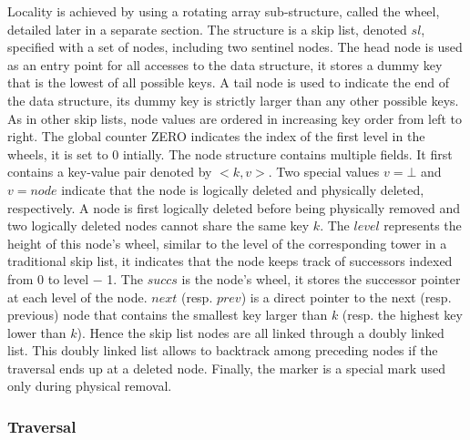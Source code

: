 \documentclass{article}
\begin{document}
Locality is achieved by using a rotating array sub-structure, called the wheel, detailed later in a separate section. The structure is a skip list, denoted $sl$, specified with a set of nodes, including two sentinel nodes. The head node is used as an entry point for all accesses to the data structure, it stores a dummy key that is the lowest of all possible keys. A tail node is used to indicate the end of the data structure, its dummy key is strictly larger than any other possible keys. As in other skip lists, node values are ordered in increasing key order from left to right. The global counter ZERO indicates the index of the first level in the wheels, it is set to 0 intially. The node structure contains multiple fields. It first contains a key-value pair denoted by $<k, v>$. Two special values $v = \bot$ and $v = node$ indicate that the node is logically deleted and physically deleted, respectively. A node is first logically deleted before being physically removed and two logically deleted nodes cannot share the same key $k$. The $level$ represents the height of this node’s wheel, similar to the level of the corresponding tower in a traditional skip list, it indicates that the node keeps track of successors indexed from 0 to level − 1. The $succs$ is the node’s wheel, it stores the successor pointer at each level of the node. $next$ (resp. $prev$) is a direct pointer to the next (resp. previous) node that contains the smallest key larger than $k$ (resp. the highest key lower than $k$). Hence the skip list nodes are all linked through a doubly linked list. This doubly linked list allows to backtrack among preceding nodes if the traversal ends up at a deleted node. Finally, the marker is a special mark used only during physical removal. 

\subsubsection{Traversal}
\label{ssec:trv}
\end{document}
